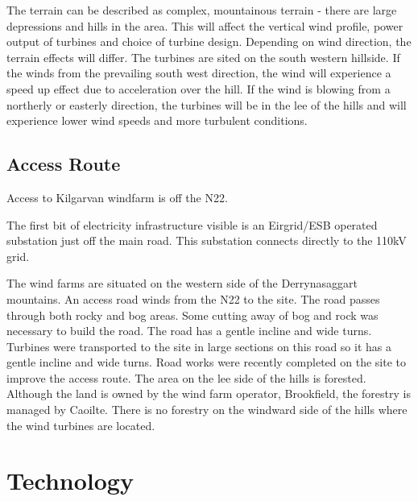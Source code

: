 \documentclass[12pt]{article} %
\begin{document}

The terrain can be described as complex, mountainous terrain - there are large depressions and hills in the area. This will affect the vertical wind profile, power output of turbines and choice of turbine design.
Depending on wind direction, the terrain effects will differ. 
The turbines are sited on the south western hillside. If the winds from the prevailing south west direction, the wind will experience a speed up effect due to acceleration over the hill.
If the wind is blowing from a northerly or easterly direction, the turbines will be in the lee of the hills and will experience lower wind speeds and more turbulent conditions.


\subsection{Access Route}
Access to Kilgarvan windfarm is off the N22. 

The first bit of electricity infrastructure visible is an Eirgrid/ESB operated substation just off the main road. This substation connects directly to the 110kV grid.

The wind farms are situated on the western side of the Derrynasaggart mountains. An access road winds from the N22 to the site. The road passes through both rocky and bog areas. Some cutting away of bog and rock was necessary to build the road. The road has a gentle incline and wide turns. Turbines were transported to the site in large sections on this road so it has a gentle incline and wide turns.
Road works were recently completed on the site to improve the access route.
The area on the lee side of the hills is forested. Although the land is owned by the wind farm operator, Brookfield, the forestry is managed by Caoilte.
There is no forestry on the windward side of the hills where the wind turbines are located.




\section{Technology}
\end{document}
